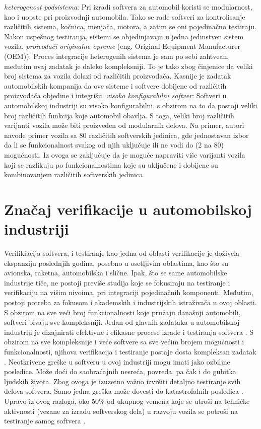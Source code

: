 \documentclass{article}
\begin{document}
\bigbreak
\textit{heterogenost podsistema}: Pri izradi softvera za automobil koristi se modularnost, kao i uopste pri proizvodnji automobila. Tako se rade softveri za kontrolisanje različitih sistema, kočnica, menjača, motora, a zatim se oni pojedinačno testiraju. Nakon uspešnog testiranja, sistemi se objedinjavaju u jedna jedinstven sistem vozila. 
\bigbreak
\textit{proivođači originalne opreme} (eng. Original Equipment Manufacturer (OEM)): Proces integracije heterogenih sistema je sam po sebi zahtvean, međutim ovaj zadatak je daleko kompleksniji. To je tako zbog činjenice da veliki broj sistema za vozila dolazi od različitih proizvođača. Kasnije je zadatak automobilskih kompanija da ove sisteme i softvere dobijene od različitih proizvođača objedine i integrišu.
\bigbreak
\textit{visoko konfigurabilni softver}: Softveri u automobilskoj industriji su visoko konfigurabilni, s obzirom na to da postoji veliki broj različitih funkcija koje automobil obavlja. S toga, veliki broj različitih varijanti vozila može biti proizveden od modularnih delova. Na primer, autori \cite{ref7} navode primer vozila sa 80 različitih softverskih jedinica, gde jednostavan izbor da li se funkcionalnost svakog od njih uključuje ili ne vodi do (2 na 80) mogućnosti. Iz ovoga se zaključuje da je moguće napraviti više varijanti vozila koji se razlikuju po funkcionalnostima koje su uključene i dobijene su kombinovanjem različitih softverskih jedinica.
\bigbreak
\section{Značaj verifikacije u automobilskoj industriji}

Verifikiacija softvera, i testiranje kao jedna od oblasti verifikacije je doživela ekspanziju poslednjih godina, posebno u osetljivim oblastima, kao što su avionska, raketna, automobilska i slične. Ipak, što se same automobilske industrije tiče, ne postoji previše studija koje se fokusiraju na testiranje i verifikaciju na višim nivoima, pri integraciji pojedinačnih komponenti. Međutim, postoji potreba za fokusom i akademskih i industrijskih istraživača u ovoj oblasti.
\bigbreak
S obzirom na sve veći broj funkcionalnosti koje pružaju današnji automobili, softveri bivaju sve kompleksniji. Jedan od glavnih zadataka u automobilskoj industriji je dizajnirati efektivne i efikasne procese izrade i testiranja softvera \cite{ref9}. S obzirom na sve kompleksnije i veće softvere sa sve većim brojem mogućnosti i funkcionalnosti, njihova verifikacija i testiranje postaje dosta kompleksan zadatak \cite{ref10}. Neotkrivene greške u softveru u ovoj industriji mogu imati jako ozbiljne posledice. Može doći do saobraćajnih nesreća, povreda, pa čak i do gubitka ljudskih života. Zbog ovoga je izuzetno važno izvršiti detaljno testiranje svih delova softvera. Samo jedna greška može dovesti do katastrofalnih posledica \cite{ref11}. Upravo iz ovog razloga, oko 50\% od ukupnog vemena koje se utroši na tehničke aktivnosti (vezane za izradu softverskog dela) u razvoju vozila se potroši na testiranje samog softvera \cite{ref12}.
\end{document}
